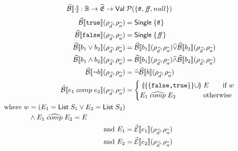 \begin{align}
    \absboolsem{\cdot} &: \mathbb{B} \rightarrow \ab{\mathfrak{E}} \rightarrow \mathsf{Val} \; \mathcal{P}(\{\true, \false, null\}) \label{eq:bool-operation}
\end{align}
\begin{align}
    \absboolsem{\texttt{true}}(\rho_{\ab{d}}, \rho_{\ab{a}}) &= \mathsf{Single} \; \{\true\} \label{eq:abstract-bool-semantics-start} \\
    \absboolsem{\texttt{false}}(\rho_{\ab{d}}, \rho_{\ab{a}}) &= \mathsf{Single} \; \{\false\} \\
    \absboolsem{b_1 \lor b_2}(\rho_{\ab{d}}, \rho_{\ab{a}}) &= \absboolsem{b_1}(\rho_{\ab{d}}, \rho_{\ab{a}}) \ab{\lor} \absboolsem{b_2}(\rho_{\ab{d}}, \rho_{\ab{a}}) \\
    \absboolsem{b_1 \land b_2}(\rho_{\ab{d}}, \rho_{\ab{a}}) &= \absboolsem{b_1}(\rho_{\ab{d}}, \rho_{\ab{a}}) \ab{\land} \absboolsem{b_2}(\rho_{\ab{d}}, \rho_{\ab{a}}) \\
    \absboolsem{\neg b}(\rho_{\ab{d}}, \rho_{\ab{a}}) &= \ab{\neg} \absboolsem{b}(\rho_{\ab{d}}, \rho_{\ab{a}})  \\
    \absboolsem{e_1 \;comp\; e_2}(\rho_{\ab{d}}, \rho_{\ab{a}}) &=  \begin{cases}
        \app{\{\{\texttt{false,true}\}\} \cup} E \quad \quad \text{if } w\\
        E_1 \;\ab{\comp}\; E_2 \quad \quad \quad \quad \text{otherwise}
    \end{cases} \nonumber \\
    \begin{split}
        \text{where } w&=(E_1 = \mathsf{List} \; S_1 \lor E_2 = \mathsf{List} \; S_2) \nonumber\\
        &\land E_1 \;\ab{\comp}\; E_2 = E \nonumber
    \end{split} \\
    \text{and } E_1 &= \absexpsem{e_1}(\rho_{\ab{d}}, \rho_{\ab{a}}) \nonumber \\
    \text{and }  E_2 &= \absexpsem{e_2}(\rho_{\ab{d}}, \rho_{\ab{a}}) \label{eq:abstract-bool-semantics-end}
\end{align}

